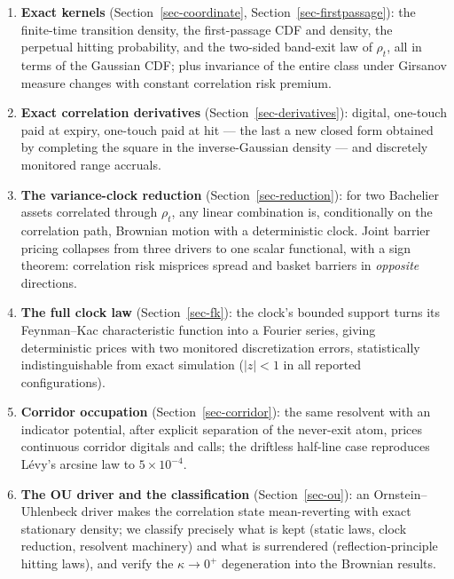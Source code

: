 \documentclass[
  english,
  10pt,
  letterpaper,
  DIV=11,
  numbers=noendperiod]{scrartcl}
\providecommand{\tightlist}{%
  \setlength{\itemsep}{0pt}\setlength{\parskip}{0pt}}
\theoremstyle{plain}
\theoremstyle{plain}
\theoremstyle{plain}
\theoremstyle{plain}
\theoremstyle{definition}
\theoremstyle{remark}
\begin{document}
\begin{enumerate}
\def\labelenumi{\arabic{enumi}.}
\tightlist
\item
  \textbf{Exact kernels} (Section~\ref{sec-coordinate},
  Section~\ref{sec-firstpassage}): the finite-time transition density,
  the first-passage CDF and density, the perpetual hitting probability,
  and the two-sided band-exit law of \(\rho_t\), all in terms of the
  Gaussian CDF; plus invariance of the entire class under Girsanov
  measure changes with constant correlation risk premium.
\item
  \textbf{Exact correlation derivatives}
  (Section~\ref{sec-derivatives}): digital, one-touch paid at expiry,
  one-touch paid at hit --- the last a new closed form obtained by
  completing the square in the inverse-Gaussian density --- and
  discretely monitored range accruals.
\item
  \textbf{The variance-clock reduction} (Section~\ref{sec-reduction}):
  for two Bachelier assets correlated through \(\rho_t\), any linear
  combination is, conditionally on the correlation path, Brownian motion
  with a deterministic clock. Joint barrier pricing collapses from three
  drivers to one scalar functional, with a sign theorem: correlation
  risk misprices spread and basket barriers in \emph{opposite}
  directions.
\item
  \textbf{The full clock law} (Section~\ref{sec-fk}): the clock's
  bounded support turns its Feynman--Kac characteristic function into a
  Fourier series, giving deterministic prices with two monitored
  discretization errors, statistically indistinguishable from exact
  simulation (\(|z|<1\) in all reported configurations).
\item
  \textbf{Corridor occupation} (Section~\ref{sec-corridor}): the same
  resolvent with an indicator potential, after explicit separation of
  the never-exit atom, prices continuous corridor digitals and calls;
  the driftless half-line case reproduces Lévy's arcsine law to
  \(5\times10^{-4}\).
\item
  \textbf{The OU driver and the classification} (Section~\ref{sec-ou}):
  an Ornstein--Uhlenbeck driver makes the correlation state
  mean-reverting with exact stationary density; we classify precisely
  what is kept (static laws, clock reduction, resolvent machinery) and
  what is surrendered (reflection-principle hitting laws), and verify
  the \(\kappa\to0^{+}\) degeneration into the Brownian results.
\end{enumerate}
\end{document}
